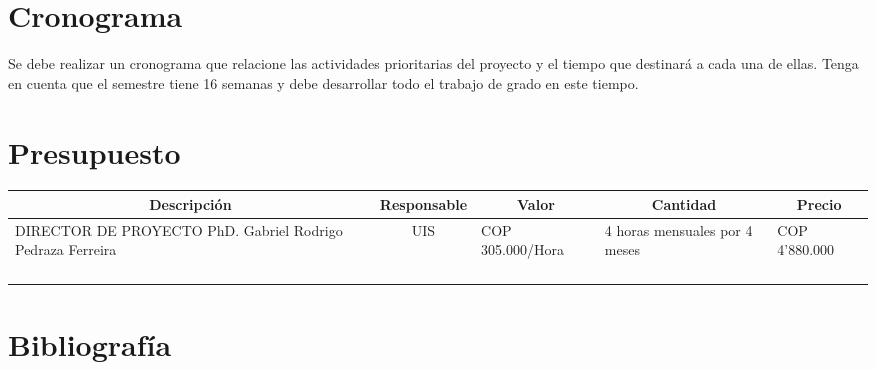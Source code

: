 \documentclass[12pt]{article}
\begin{document}
    \section{Cronograma}

    Se debe realizar un cronograma que relacione las actividades prioritarias del proyecto y el tiempo que destinará a cada una de ellas. Tenga en cuenta que el semestre tiene 16 semanas y debe desarrollar todo el trabajo de grado en este tiempo. 

    \section{Presupuesto}
    
    \begin{table}[ht]
    \small
            \begin{tabularx}{\textwidth}{|X|c|X|X|X|}
                \hline
                \multicolumn{1}{|c}{\textbf{Descripción}} & \multicolumn{1}{|c}{\textbf{Responsable}} & \multicolumn{1}{|c}{\textbf{Valor}} & \multicolumn{1}{|c}{\textbf{Cantidad}} & \multicolumn{1}{|c|}{\textbf{Precio}} \\ \hline
                DIRECTOR DE PROYECTO PhD. Gabriel Rodrigo Pedraza Ferreira & UIS & COP 305.000/Hora & \multicolumn{1}{X|}{\raggedright 4 horas mensuales por 4 meses} & COP 4'880.000 \\ \hline
        &  &  &  &  \\ \hline
        &  &  &  &  \\ \hline
        &  &  &  &  \\ \hline
        &  &  &  &  \\ \hline
        
        \end{tabularx}{\parfillskip=0pt\par}
    \end{table}
    

    \pagebreak

    \section{Bibliografía}

    \begingroup
    \renewcommand{\section}[2]{}
    \renewcommand{\addcontentsline}[3]{}
    
    \endgroup
\end{document}
